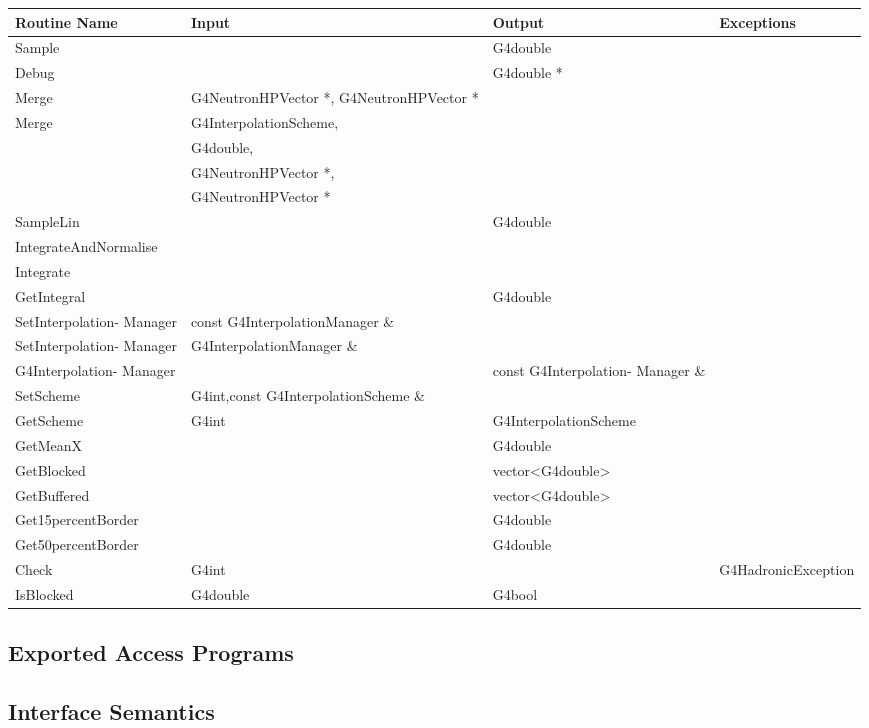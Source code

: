 \documentclass[12pt]{article}
\begin{document}
\begin{tabular}{| p{4cm} | p{4cm} | p{4cm} |  p{4cm} |}
\hline
Routine Name & Input & Output & Exceptions \\ \hline
Sample & & G4double & \\ \hline
Debug & & G4double * & \\ \hline
Merge & G4NeutronHPVector *,  G4NeutronHPVector *& & \\ \hline
Merge & G4InterpolationScheme, & & \\ 
&  G4double,  & & \\
& G4NeutronHPVector *,  & & \\
& G4NeutronHPVector * & & \\ \hline
SampleLin & & G4double & \\ \hline
IntegrateAndNormalise & & & \\ \hline
Integrate & & & \\ \hline
GetIntegral & & G4double & \\ \hline
SetInterpolation- Manager & const G4InterpolationManager \& & & \\ \hline
SetInterpolation- Manager & G4InterpolationManager \& & & \\ \hline
G4Interpolation- Manager & & const G4Interpolation- Manager  \& & \\ \hline
SetScheme & G4int,const G4InterpolationScheme \& & & \\ \hline
GetScheme & G4int & G4InterpolationScheme & \\ \hline
GetMeanX & & G4double & \\ \hline
GetBlocked & & vector\textless G4double\textgreater & \\ \hline
GetBuffered & & vector\textless G4double\textgreater & \\ \hline
Get15percentBorder & & G4double & \\ \hline
Get50percentBorder & & G4double & \\ \hline
Check & G4int & & G4HadronicException \\ \hline
IsBlocked & G4double & G4bool & \\ \hline
\end{tabular}
\subsection{Exported Access Programs}%

\subsection{Interface Semantics}
\end{document}
